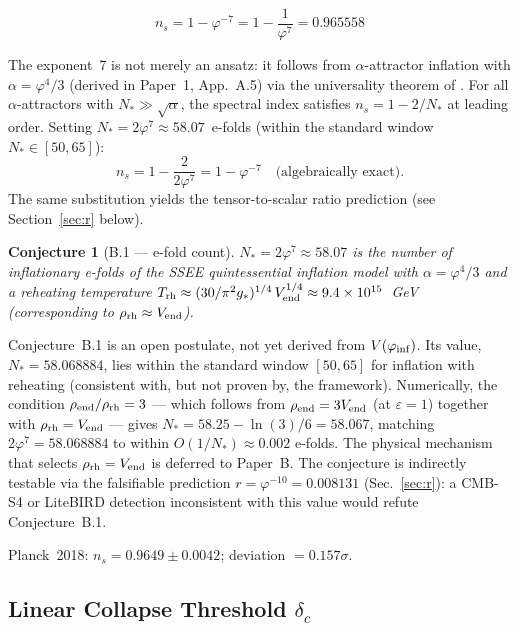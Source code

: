 \documentclass[12pt,a4paper]{article}
\newtheorem{conjecture}{Conjecture}
\begin{document}
\begin{equation}
\boxed{n_s = 1 - \varphi^{-7} = 1 - \frac{1}{\varphi^7} = 0.965558}
\label{eq:ns}
\end{equation}

The exponent~7 is not merely an ansatz: it follows from $\alpha$-attractor inflation
with $\alpha = \varphi^4/3$ (derived in Paper~1, App.~A.5) via the universality theorem
of \citet{Kallosh2013}. For all $\alpha$-attractors with $N_\ast \gg \sqrt\alpha$, the
spectral index satisfies $n_s = 1 - 2/N_\ast$ at leading order. Setting
$N_\ast = 2\varphi^7 \approx 58.07$~e-folds (within the standard window $N_\ast \in[50,65]$):
\begin{equation}
n_s = 1 - \frac{2}{2\varphi^7} = 1 - \varphi^{-7} \quad \text{(algebraically exact)}.
\end{equation}
The same substitution yields the tensor-to-scalar ratio prediction (see
Section~\ref{sec:r} below).

\begin{conjecture}[B.1 — e-fold count]
$N_\ast = 2\varphi^7 \approx 58.07$ is the number of inflationary e-folds of the
SSEE quintessential inflation model with $\alpha = \varphi^4/3$ and a reheating
temperature $T_{\rm rh} \approx (30/\pi^2 g_*)^{1/4}\,V_{\rm end}^{1/4}
\approx 9.4\times10^{15}$~GeV (corresponding to $\rho_{\rm rh}\approx V_{\rm end}$).
\end{conjecture}

Conjecture~B.1 is an open postulate, not yet derived from $V(\varphi_{\rm inf})$.
Its value, $N_\ast = 58.068884$, lies within the standard window $[50, 65]$ for
inflation with reheating (consistent with, but not proven by, the framework).
Numerically, the condition $\rho_{\rm end}/\rho_{\rm rh} = 3$ — which follows from
$\rho_{\rm end}=3V_{\rm end}$ (at $\varepsilon=1$) together with
$\rho_{\rm rh}=V_{\rm end}$ — gives $N_\ast = 58.25 - \ln(3)/6 = 58.067$,
matching $2\varphi^7 = 58.068884$ to within $O(1/N_\ast)\approx 0.002$ e-folds.
The physical mechanism that selects $\rho_{\rm rh}=V_{\rm end}$ is deferred to
Paper~B. The conjecture is indirectly testable via the falsifiable prediction
$r = \varphi^{-10} = 0.008131$ (Sec.~\ref{sec:r}): a CMB-S4 or LiteBIRD detection
inconsistent with this value would refute Conjecture~B.1.

Planck~2018: $n_s = 0.9649\pm0.0042$; deviation $= 0.157\sigma$.

\subsection{Linear Collapse Threshold $\delta_c$}
\label{sec:deltac}
\end{document}
